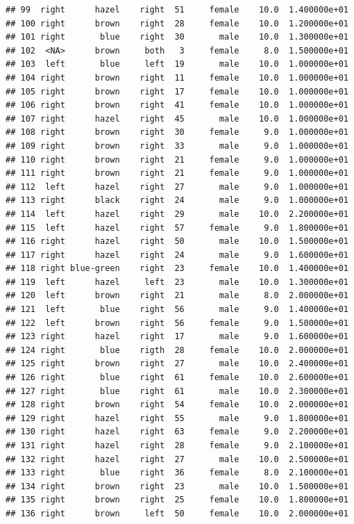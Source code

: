 \documentclass[]{article}
\begin{document}
\begin{verbatim}
## 99  right      hazel    right  51     female    10.0  1.400000e+01
## 100 right      brown    right  28     female    10.0  1.200000e+01
## 101 right       blue    right  30       male    10.0  1.300000e+01
## 102  <NA>      brown     both   3     female     8.0  1.500000e+01
## 103  left       blue     left  19       male    10.0  1.000000e+01
## 104 right      brown    right  11     female    10.0  1.000000e+01
## 105 right      brown    right  17     female    10.0  1.000000e+01
## 106 right      brown    right  41     female    10.0  1.000000e+01
## 107 right      hazel    right  45       male    10.0  1.000000e+01
## 108 right      brown    right  30     female     9.0  1.000000e+01
## 109 right      brown    right  33       male     9.0  1.000000e+01
## 110 right      brown    right  21     female     9.0  1.000000e+01
## 111 right      brown    right  21     female     9.0  1.000000e+01
## 112  left      hazel    right  27       male     9.0  1.000000e+01
## 113 right      black    right  24       male     9.0  1.000000e+01
## 114  left      hazel    right  29       male    10.0  2.200000e+01
## 115  left      hazel    right  57     female     9.0  1.800000e+01
## 116 right      hazel    right  50       male    10.0  1.500000e+01
## 117 right      hazel    right  24       male     9.0  1.600000e+01
## 118 right blue-green    right  23     female    10.0  1.400000e+01
## 119  left      hazel     left  23       male    10.0  1.300000e+01
## 120  left      brown    right  21       male     8.0  2.000000e+01
## 121  left       blue    right  56       male     9.0  1.400000e+01
## 122  left      brown    right  56     female     9.0  1.500000e+01
## 123 right      hazel    right  17       male     9.0  1.600000e+01
## 124 right       blue    rigth  28     female    10.0  2.000000e+01
## 125 right      brown    right  27       male    10.0  2.400000e+01
## 126 right       blue    right  61     female    10.0  2.600000e+01
## 127 right       blue    right  61       male    10.0  2.300000e+01
## 128 right      brown    right  54     female    10.0  2.000000e+01
## 129 right      hazel    right  55       male     9.0  1.800000e+01
## 130 right      hazel    right  63     female     9.0  2.200000e+01
## 131 right      hazel    right  28     female     9.0  2.100000e+01
## 132 right      hazel    right  27       male    10.0  2.500000e+01
## 133 right       blue    right  36     female     8.0  2.100000e+01
## 134 right      brown    right  23       male    10.0  1.500000e+01
## 135 right      brown    right  25     female    10.0  1.800000e+01
## 136 right      brown     left  50     female    10.0  2.000000e+01

\end{verbatim}
\end{document}
